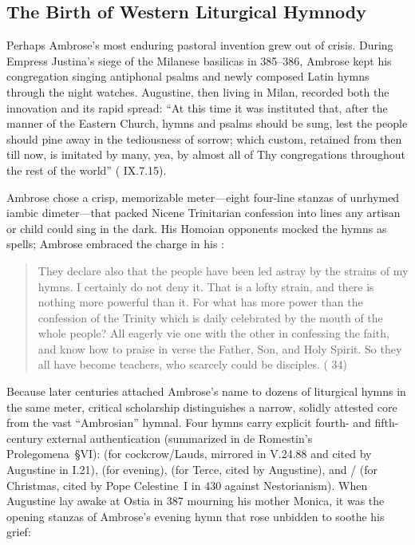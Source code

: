 \subsection{The Birth of Western Liturgical Hymnody}

Perhaps Ambrose's most enduring pastoral invention grew out of crisis. During Empress Justina's siege of the Milanese basilicas in 385--386, Ambrose kept his congregation singing antiphonal psalms and newly composed Latin hymns through the night watches. Augustine, then living in Milan, recorded both the innovation and its rapid spread: ``At this time it was instituted that, after the manner of the Eastern Church, hymns and psalms should be sung, lest the people should pine away in the tediousness of sorrow; which custom, retained from then till now, is imitated by many, yea, by almost all of Thy congregations throughout the rest of the world'' ( IX.7.15).

Ambrose chose a crisp, memorizable meter---eight four-line stanzas of unrhymed iambic dimeter---that packed Nicene Trinitarian confession into lines any artisan or child could sing in the dark. His Homoian opponents mocked the hymns as spells; Ambrose embraced the charge in his :

\begin{quote}
They declare also that the people have been led astray by the strains of my hymns. I certainly do not deny it. That is a lofty strain, and there is nothing more powerful than it. For what has more power than the confession of the Trinity which is daily celebrated by the mouth of the whole people? All eagerly vie one with the other in confessing the faith, and know how to praise in verse the Father, Son, and Holy Spirit. So they all have become teachers, who scarcely could be disciples. ( 34)
\end{quote}

Because later centuries attached Ambrose's name to dozens of liturgical hymns in the same meter, critical scholarship distinguishes a narrow, solidly attested core from the vast ``Ambrosian'' hymnal. Four hymns carry explicit fourth- and fifth-century external authentication (summarized in de Romestin's Prolegomena~\S VI):  (for cockcrow/Lauds, mirrored in  V.24.88 and cited by Augustine in  I.21),  (for evening),  (for Terce, cited by Augustine), and  /  (for Christmas, cited by Pope Celestine~I in 430 against Nestorianism). When Augustine lay awake at Ostia in 387 mourning his mother Monica, it was the opening stanzas of Ambrose's evening hymn that rose unbidden to soothe his grief:

